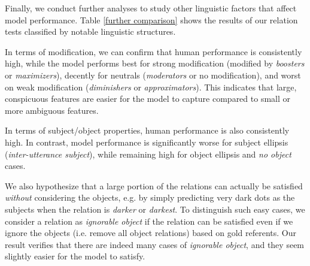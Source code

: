 Finally, we conduct further analyses to study other linguistic factors that affect model performance. Table \ref{further comparison} shows the results of our relation tests classified by notable linguistic structures.

In terms of modification, we can confirm that human performance is consistently high, while the model performs best for strong modification (modified by \textit{boosters} or \textit{maximizers}), decently for neutrals (\textit{moderators} or no modification), and worst on weak modification (\textit{diminishers} or \textit{approximators}). This indicates that large, conspicuous features are easier for the model to capture compared to small or more ambiguous features.

In terms of subject/object properties, human performance is also consistently high. In contrast, model performance is significantly worse for subject ellipsis (\textit{inter-utterance subject}), while remaining high for object ellipsis and \textit{no object} cases.

We also hypothesize that a large portion of the relations can actually be satisfied \textit{without} considering the objects, e.g. by simply predicting very dark dots as the subjects when the relation is \textit{darker} or \textit{darkest}. To distinguish such easy cases, we consider a relation as \textit{ignorable object} if the relation can be satisfied even if we ignore the objects (i.e. remove all object relations) based on gold referents. Our result verifies that there are indeed many cases of \textit{ignorable object}, and they seem slightly easier for the model to satisfy.

